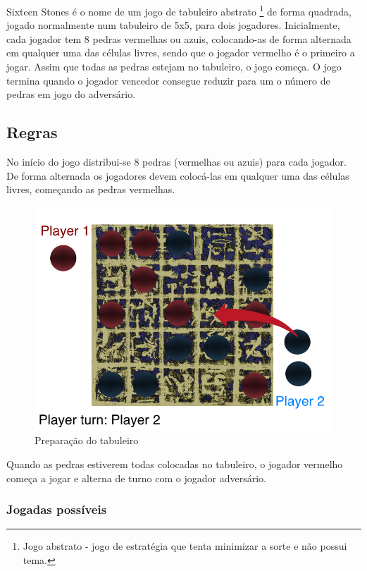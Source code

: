 \documentclass[a4paper]{article}
\begin{document}
Sixteen Stones é o nome de um jogo de tabuleiro abstrato \footnote{Jogo abstrato - jogo de estratégia que tenta minimizar a sorte e não possui tema.} de forma quadrada, jogado normalmente num tabuleiro de 5x5, para dois jogadores. Inicialmente, cada jogador tem 8 pedras vermelhas ou azuis, colocando-as de forma alternada em qualquer uma das células livres, sendo que o jogador vermelho é o primeiro a jogar. Assim que todas as pedras estejam no tabuleiro, o jogo começa. O jogo termina quando o jogador vencedor consegue reduzir para um o número de pedras em jogo do adversário.

\subsection{Regras}

No início do jogo distribui-se 8 pedras (vermelhas ou azuis) para cada jogador. De forma alternada os jogadores devem colocá-las em qualquer uma das células livres, começando as pedras vermelhas.

\begin{figure}[!htb]
\centering
\includegraphics[scale=0.3]{board_prep.png} 
\caption{Preparação do tabuleiro}
\end{figure}

Quando as pedras estiverem todas colocadas no tabuleiro, o jogador vermelho começa a jogar e alterna de turno com o jogador adversário.

\subsubsection{Jogadas possíveis}
\end{document}

